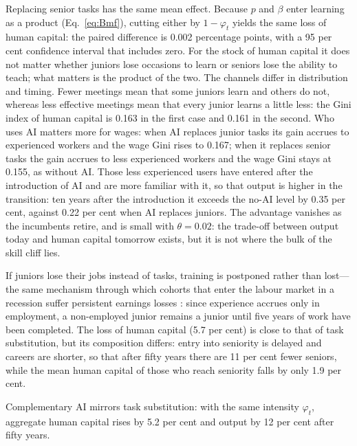 \documentclass[preprint,12pt,authoryear]{elsarticle}
\begin{document}
Replacing senior tasks has the same mean effect. Because $p$ and $\beta$ enter learning as a product (Eq.~\eqref{eq:Bmf}), cutting either by $1-\varphi_t$ yields the same loss of human capital: the paired difference is 0.002 percentage points, with a 95 per cent confidence interval that includes zero. For the stock of human capital it does not matter whether juniors lose occasions to learn or seniors lose the ability to teach; what matters is the product of the two. The channels differ in distribution and timing. Fewer meetings mean that some juniors learn and others do not, whereas less effective meetings mean that every junior learns a little less: the Gini index of human capital is 0.163 in the first case and 0.161 in the second. Who uses AI matters more for wages: when AI replaces junior tasks its gain accrues to experienced workers and the wage Gini rises to 0.167; when it replaces senior tasks the gain accrues to less experienced workers and the wage Gini stays at 0.155, as without AI. Those less experienced users have entered after the introduction of AI and are more familiar with it, so that output is higher in the transition: ten years after the introduction it exceeds the no-AI level by 0.35 per cent, against 0.22 per cent when AI replaces juniors. The advantage vanishes as the incumbents retire, and is small with $\theta=0.02$: the trade-off between output today and human capital tomorrow exists, but it is not where the bulk of the skill cliff lies.

If juniors lose their jobs instead of tasks, training is postponed rather than lost---the same mechanism through which cohorts that enter the labour market in a recession suffer persistent earnings losses \citep{Kahn2010,Oreopoulos2012}: since experience accrues only in employment, a non-employed junior remains a junior until five years of work have been completed. The loss of human capital (5.7 per cent) is close to that of task substitution, but its composition differs: entry into seniority is delayed and careers are shorter, so that after fifty years there are 11 per cent fewer seniors, while the mean human capital of those who reach seniority falls by only 1.9 per cent.

Complementary AI mirrors task substitution: with the same intensity $\varphi_t$, aggregate human capital rises by 5.2 per cent and output by 12 per cent after fifty years.
\end{document}
